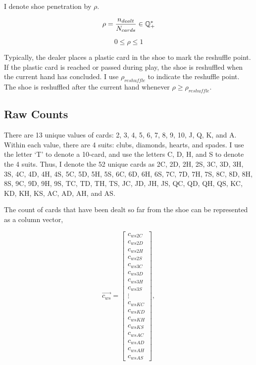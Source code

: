 I denote shoe penetration by $\rho$.

\begin{equation}
\label{eq:cmct0:sctp0:nspn0:01}
\rho = \frac{n_{dealt}}{N_{cards}} \in {\mathbb{Q}^*_+}
\end{equation}

\begin{equation}
\label{eq:cmct0:sctp0:nspn0:02}
0 \leq \rho \leq 1
\end{equation}

Typically, the dealer places a plastic card in the shoe to mark the reshuffle point.
If the plastic card is reached or passed during play, the shoe is reshuffled
when the current hand has concluded.  I use $\rho_{reshuffle}$ to indicate the reshuffle point.
The shoe is reshuffled after the current hand whenever $\rho \geq \rho_{reshuffle}$.


\subsection{Raw Counts}
\label{cmct0:sctp0:swct0}

There are 13 unique values of cards:  2, 3, 4, 5, 6, 7, 8, 9, 10, J, Q, K, and A.
Within each value, there are 4 suits:  clubs, diamonds, hearts, and spades.  I use the letter `T'
to denote a 10-card, and use the letters C, D, H, and S to denote the 4 suits.
Thus, I denote the 52 unique cards as 2C, 2D, 2H, 2S,
3C, 3D, 3H, 3S,
4C, 4D, 4H, 4S,
5C, 5D, 5H, 5S,
6C, 6D, 6H, 6S,
7C, 7D, 7H, 7S,
8C, 8D, 8H, 8S,
9C, 9D, 9H, 9S,
TC, TD, TH, TS,
JC, JD, JH, JS,
QC, QD, QH, QS,
KC, KD, KH, KS,
AC, AD, AH, and AS.


The count of cards that have been dealt so far from the shoe can be represented
as a column vector,

\begin{equation}
\label{eq:cmct0:sctp0:swct0:01}
\overrightarrow{c_{ws}}
=
\left[ \begin{array}{c}
c_{ws2C}   \\
c_{ws2D}   \\
c_{ws2H}   \\
c_{ws2S}   \\
c_{ws3C}   \\
c_{ws3D}   \\
c_{ws3H}   \\
c_{ws3S}   \\
\vdots     \\
c_{wsKC}   \\
c_{wsKD}   \\
c_{wsKH}   \\
c_{wsKS}   \\
c_{wsAC}   \\
c_{wsAD}   \\
c_{wsAH}   \\
c_{wsAS}
\end{array}\right],
\end{equation}

